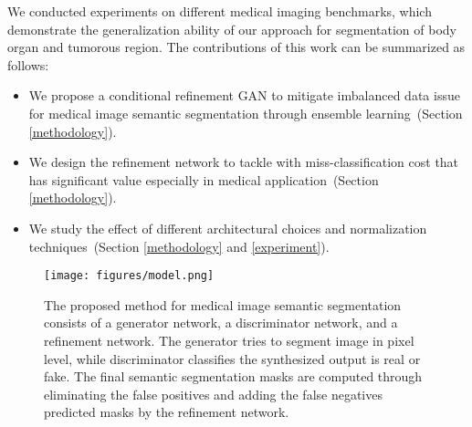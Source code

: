 \documentclass[10pt,twocolumn,letterpaper]{article}
\begin{document}
We conducted experiments on different medical imaging benchmarks, which demonstrate the generalization ability of our approach for segmentation of body organ and tumorous region. %
The contributions of this work can be summarized as follows:
\begin{itemize}

\item We propose a conditional refinement GAN to mitigate imbalanced data issue for medical image semantic segmentation through ensemble learning~(Section \ref{methodology}).

\item We design the refinement network to tackle with miss-classification cost that has significant value especially in medical application~(Section \ref{methodology}).

\item We study the effect of different architectural choices and normalization techniques~(Section \ref{methodology} and \ref{experiment}).


\end{itemize}\begin{figure}[!t]
\texttt{[image: figures/model.png]}
\centering
\caption{The proposed method for medical image semantic segmentation consists of a generator network, a discriminator network, and a refinement network. The generator tries to segment image in pixel level, while discriminator classifies the synthesized output is real or fake. The final semantic segmentation masks are computed through eliminating the false positives and adding the false negatives predicted masks by the refinement network.}
\label{fig_model}
\end{figure}
\end{document}

